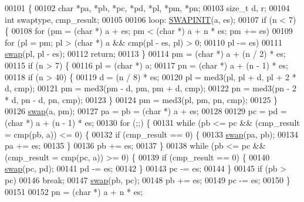\begin{DoxyCode}
{{00101 \{
00102     \textcolor{keywordtype}{char} *pa, *pb, *pc, *pd, *pl, *pm, *pn;
00103     size\_t d, r;
00104     \textcolor{keywordtype}{int} swaptype, cmp\_result;
00105 
00106 loop:   \hyperlink{pqsort_8c_ae05386e947a28313dfc55049cbed825a}{SWAPINIT}(a, es);
00107     \textcolor{keywordflow}{if} (n < 7) \{
00108         \textcolor{keywordflow}{for} (pm = (\textcolor{keywordtype}{char} *) a + es; pm < (\textcolor{keywordtype}{char} *) a + n * es; pm += es)
00109             \textcolor{keywordflow}{for} (pl = pm; pl > (\textcolor{keywordtype}{char} *) a && cmp(pl - es, pl) > 0;
00110                  pl -= es)
00111                 \hyperlink{pqsort_8c_a3ca5ecd34b04d6a243c054ac3a57f68d}{swap}(pl, pl - es);
00112         \textcolor{keywordflow}{return};
00113     \}
00114     pm = (\textcolor{keywordtype}{char} *) a + (n / 2) * es;
00115     \textcolor{keywordflow}{if} (n > 7) \{
00116         pl = (\textcolor{keywordtype}{char} *) a;
00117         pn = (\textcolor{keywordtype}{char} *) a + (n - 1) * es;
00118         \textcolor{keywordflow}{if} (n > 40) \{
00119             d = (n / 8) * es;
00120             pl = med3(pl, pl + d, pl + 2 * d, cmp);
00121             pm = med3(pm - d, pm, pm + d, cmp);
00122             pn = med3(pn - 2 * d, pn - d, pn, cmp);
00123         \}
00124         pm = med3(pl, pm, pn, cmp);
00125     \}
00126     \hyperlink{pqsort_8c_a3ca5ecd34b04d6a243c054ac3a57f68d}{swap}(a, pm);
00127     pa = pb = (\textcolor{keywordtype}{char} *) a + es;
00128 
00129     pc = pd = (\textcolor{keywordtype}{char} *) a + (n - 1) * es;
00130     \textcolor{keywordflow}{for} (;;) \{
00131         \textcolor{keywordflow}{while} (pb <= pc && (cmp\_result = cmp(pb, a)) <= 0) \{
00132             \textcolor{keywordflow}{if} (cmp\_result == 0) \{
00133                 \hyperlink{pqsort_8c_a3ca5ecd34b04d6a243c054ac3a57f68d}{swap}(pa, pb);
00134                 pa += es;
00135             \}
00136             pb += es;
00137         \}
00138         \textcolor{keywordflow}{while} (pb <= pc && (cmp\_result = cmp(pc, a)) >= 0) \{
00139             \textcolor{keywordflow}{if} (cmp\_result == 0) \{
00140                 \hyperlink{pqsort_8c_a3ca5ecd34b04d6a243c054ac3a57f68d}{swap}(pc, pd);
00141                 pd -= es;
00142             \}
00143             pc -= es;
00144         \}
00145         \textcolor{keywordflow}{if} (pb > pc)
00146             \textcolor{keywordflow}{break};
00147         \hyperlink{pqsort_8c_a3ca5ecd34b04d6a243c054ac3a57f68d}{swap}(pb, pc);
00148         pb += es;
00149         pc -= es;
00150     \}
00151 
00152     pn = (\textcolor{keywordtype}{char} *) a + n * es;
}}
\end{DoxyCode}
